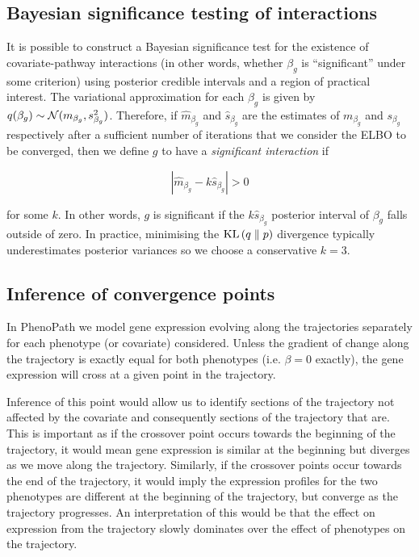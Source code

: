 \subsection{Bayesian significance testing of interactions}

It is possible to construct a Bayesian significance test for the existence of covariate-pathway interactions (in other words, whether $\beta_g$ is ``significant'' under some criterion) using posterior credible intervals and a region of practical interest. The variational approximation for each $\beta_g$ is given by $q(\beta_g) \sim \mathcal{N}(m_{\beta_g}, s^2_{\beta_g})$. Therefore, if $\hat{m}_{\beta_g}$ and $\hat{s}_{\beta_g}$ are the estimates of $m_{\beta_g}$ and $s_{\beta_g}$ respectively after a sufficient number of iterations that we consider the ELBO to be converged, then we define $g$ to have a \emph{significant interaction}
if

\begin{equation}
  | \hat{m}_{\beta_g} - k \hat{s}_{\beta_g} | > 0
\end{equation}

for some $k$. In other words, $g$ is significant if the $k \hat{s}_{\beta_g}$ posterior interval of $\beta_g$ falls outside of zero.  In practice, minimising the $\textrm{KL}\left(q\;\|\;p\right)$ divergence typically underestimates posterior variances \citep{blei2016variational} so we choose a conservative $k=3$.

\subsection{Inference of convergence points} \label{sec:crossover}

In PhenoPath we model gene expression evolving along the trajectories separately for each phenotype (or covariate) considered. Unless the gradient of change along the trajectory is exactly equal for both phenotypes (i.e. $\beta = 0$ exactly), the gene expression will cross at a given point in the trajectory.

Inference of this point would allow us to identify sections of the trajectory not affected by the covariate and consequently sections of the trajectory that are. This is important as if the crossover point occurs towards the beginning of the trajectory, it would mean gene expression is similar at the beginning but diverges as we move along the trajectory. Similarly, if the crossover points occur towards the end of the trajectory, it would imply the expression profiles for the two phenotypes are different at the beginning of the trajectory, but converge as the trajectory progresses. An interpretation of this would be that the effect on expression from the trajectory slowly dominates over the effect of phenotypes on the trajectory.

